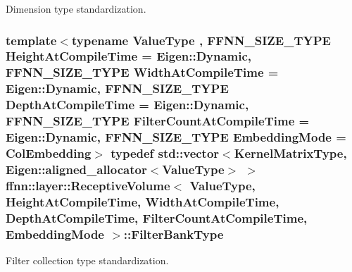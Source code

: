 Dimension type standardization. 

\hypertarget{classffnn_1_1layer_1_1_receptive_volume_a7c97795baaf3c9b1e7db3cb3841d8829}{
\subsubsection[{Filter\-Bank\-Type}]{\setlength{\rightskip}{0pt plus 5cm}template$<$typename Value\-Type , F\-F\-N\-N\-\_\-\-S\-I\-Z\-E\-\_\-\-T\-Y\-P\-E Height\-At\-Compile\-Time = Eigen\-::\-Dynamic, F\-F\-N\-N\-\_\-\-S\-I\-Z\-E\-\_\-\-T\-Y\-P\-E Width\-At\-Compile\-Time = Eigen\-::\-Dynamic, F\-F\-N\-N\-\_\-\-S\-I\-Z\-E\-\_\-\-T\-Y\-P\-E Depth\-At\-Compile\-Time = Eigen\-::\-Dynamic, F\-F\-N\-N\-\_\-\-S\-I\-Z\-E\-\_\-\-T\-Y\-P\-E Filter\-Count\-At\-Compile\-Time = Eigen\-::\-Dynamic, F\-F\-N\-N\-\_\-\-S\-I\-Z\-E\-\_\-\-T\-Y\-P\-E Embedding\-Mode = Col\-Embedding$>$ typedef std\-::vector$<${\bf Kernel\-Matrix\-Type}, Eigen\-::aligned\-\_\-allocator$<$Value\-Type$>$ $>$ {\bf ffnn\-::layer\-::\-Receptive\-Volume}$<$ Value\-Type, Height\-At\-Compile\-Time, Width\-At\-Compile\-Time, Depth\-At\-Compile\-Time, Filter\-Count\-At\-Compile\-Time, {\bf Embedding\-Mode} $>$\-::{\bf Filter\-Bank\-Type}}}\label{classffnn_1_1layer_1_1_receptive_volume_a7c97795baaf3c9b1e7db3cb3841d8829}


Filter collection type standardization. 

